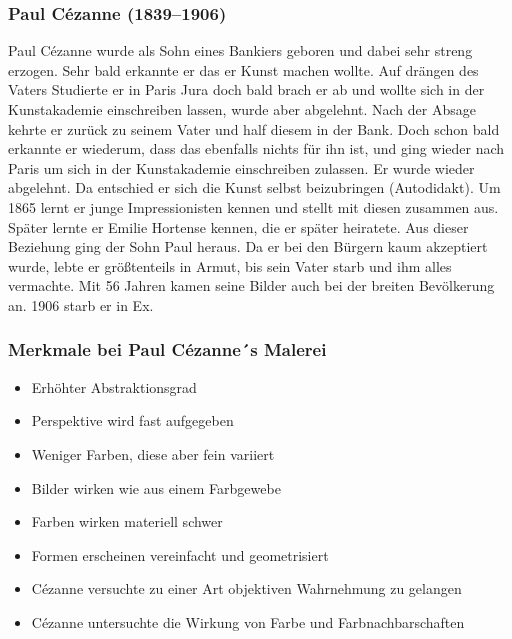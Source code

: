 \subsubsection{Paul Cézanne (1839--1906)}
Paul Cézanne wurde als Sohn eines Bankiers geboren und dabei sehr streng erzogen. Sehr bald erkannte er das er Kunst machen
wollte. Auf drängen des Vaters Studierte er in Paris Jura doch bald brach er ab und wollte sich in der Kunstakademie
einschreiben lassen, wurde aber abgelehnt. Nach der Absage kehrte er zurück zu seinem Vater und half diesem in der Bank.
Doch schon bald erkannte er wiederum, dass das ebenfalls nichts für ihn ist, und ging wieder nach Paris um sich in der
Kunstakademie einschreiben zulassen. Er wurde wieder abgelehnt. Da entschied er sich die Kunst selbst beizubringen
(Autodidakt). Um 1865 lernt er junge Impressionisten kennen und stellt mit diesen zusammen aus. Später lernte er Emilie
Hortense kennen, die er später heiratete. Aus dieser Beziehung ging der Sohn Paul heraus. Da er bei den Bürgern kaum
akzeptiert wurde, lebte er größtenteils in Armut, bis sein Vater starb und ihm alles vermachte. Mit 56 Jahren kamen seine
Bilder auch bei der breiten Bevölkerung an. 1906 starb er in Ex.

\subsubsection{Merkmale bei Paul Cézanne´s Malerei}
\begin{itemize}
	\item Erhöhter Abstraktionsgrad
	\item Perspektive wird fast aufgegeben
	\item Weniger Farben, diese aber fein variiert
	\item Bilder wirken wie aus einem Farbgewebe
	\item Farben wirken materiell schwer
	\item Formen erscheinen vereinfacht und geometrisiert
	\item Cézanne versuchte zu einer Art objektiven Wahrnehmung zu gelangen
	\item Cézanne untersuchte die Wirkung von Farbe und Farbnachbarschaften
\end{itemize}

